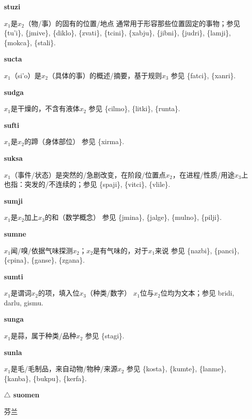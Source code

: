 \documentclass[notitlepage,twocolumn,a4paper,10pt]{book}
\begin{document}
{\sffamily\bfseries stuzi}  $x_1$是$x_2$（物\slash{}事）的固有的位置\slash{}地点 \textemdash{} 通常用于形容那些位置固定的事物；参见 \{tu'i\}, \{jmive\}, \{diklo\}, \{zvati\}, \{tcini\}, \{xabju\}, \{jibni\}, \{judri\}, \{lamji\}, \{mokca\}, \{stali\}.

{\sffamily\bfseries sucta}\enspace {\ttfamily\bfseries[suc]}  $x_1$（si'o）是$x_2$（具体的事）的概述\slash{}摘要，基于规则$x_3$ \textemdash{} 参见 \{fatci\}, \{xanri\}.

{\sffamily\bfseries sudga}\enspace {\ttfamily\bfseries[sud]}  $x_1$是干燥的，不含有液体$x_2$ \textemdash{} 参见 \{cilmo\}, \{litki\}, \{runta\}.

{\sffamily\bfseries sufti}\enspace {\ttfamily\bfseries[    sfu]}  $x_1$是$x_2$的蹄（身体部位） \textemdash{} 参见 \{xirma\}.

{\sffamily\bfseries suksa}\enspace {\ttfamily\bfseries[suk]}  $x_1$（事件\slash{}状态）是突然的\slash{}急剧改变，在阶段\slash{}位置点$x_2$，在进程\slash{}性质\slash{}用途$x_3$上 \textemdash{} 也指：突发的\slash{}不连续的；参见 \{spaji\}, \{vitci\}, \{vlile\}.

{\sffamily\bfseries sumji}\enspace {\ttfamily\bfseries[suj]}  $x_1$是$x_2$加上$x_3$的和（数学概念） \textemdash{} 参见 \{jmina\}, \{jalge\}, \{mulno\}, \{pilji\}.

{\sffamily\bfseries sumne} $x_1$闻\slash{}嗅\slash{}依据气味探测$x_2$；$x_2$是有气味的，对于$x_1$来说 \textemdash{} 参见 \{nazbi\}, \{panci\}, \{cpina\}, \{ganse\}, \{zgana\}.

{\sffamily\bfseries sumti}\enspace {\ttfamily\bfseries[sum     su'i]}  $x_1$是谓词$x_2$的项，填入位$x_3$（种类\slash{}数字） \textemdash{} $x_1$位与$x_2$位均为文本；参见 {bridi}, {darlu}, {gismu}.

{\sffamily\bfseries sunga}\enspace {\ttfamily\bfseries[sug]}  $x_1$是蒜，属于种类\slash{}品种$x_2$ \textemdash{} 参见 \{stagi\}.

{\sffamily\bfseries sunla}\enspace {\ttfamily\bfseries[sul]}  $x_1$是毛\slash{}毛制品，来自动物\slash{}物种\slash{}来源$x_2$ \textemdash{} 参见 \{kosta\}, \{kumte\}, \{lanme\}, \{kanba\}, \{bukpu\}, \{kerfa\}.

{\sffamily\bfseries $\triangle$ suomen} 芬兰
\end{document}

